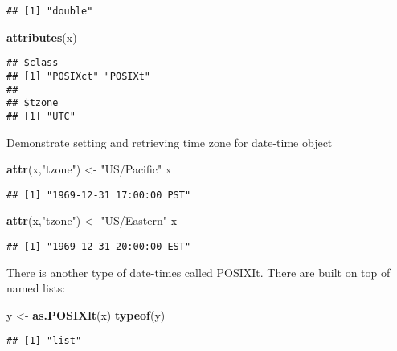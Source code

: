 \documentclass[
]{article}
\newenvironment{Shaded}{\begin{snugshade}}{\end{snugshade}}
\newcommand{\FunctionTok}[1]{\textcolor[rgb]{0.13,0.29,0.53}{\textbf{#1}}}
\newcommand{\NormalTok}[1]{#1}
\newcommand{\OtherTok}[1]{\textcolor[rgb]{0.56,0.35,0.01}{#1}}
\newcommand{\StringTok}[1]{\textcolor[rgb]{0.31,0.60,0.02}{#1}}
\begin{document}
\begin{verbatim}
## [1] "double"
\end{verbatim}

\begin{Shaded}
\begin{Highlighting}[]
\FunctionTok{attributes}\NormalTok{(x)}
\end{Highlighting}
\end{Shaded}

\begin{verbatim}
## $class
## [1] "POSIXct" "POSIXt" 
## 
## $tzone
## [1] "UTC"
\end{verbatim}

Demonstrate setting and retrieving time zone for date-time object

\begin{Shaded}
\begin{Highlighting}[]
\FunctionTok{attr}\NormalTok{(x,}\StringTok{"tzone"}\NormalTok{) }\OtherTok{\textless{}{-}} \StringTok{"US/Pacific"}
\NormalTok{x}
\end{Highlighting}
\end{Shaded}

\begin{verbatim}
## [1] "1969-12-31 17:00:00 PST"
\end{verbatim}

\begin{Shaded}
\begin{Highlighting}[]
\FunctionTok{attr}\NormalTok{(x,}\StringTok{"tzone"}\NormalTok{) }\OtherTok{\textless{}{-}} \StringTok{"US/Eastern"}
\NormalTok{x}
\end{Highlighting}
\end{Shaded}

\begin{verbatim}
## [1] "1969-12-31 20:00:00 EST"
\end{verbatim}

There is another type of date-times called POSIXIt. There are built on
top of named lists:

\begin{Shaded}
\begin{Highlighting}[]
\NormalTok{y }\OtherTok{\textless{}{-}} \FunctionTok{as.POSIXlt}\NormalTok{(x)}
\FunctionTok{typeof}\NormalTok{(y)}
\end{Highlighting}
\end{Shaded}

\begin{verbatim}
## [1] "list"
\end{verbatim}
\end{document}
